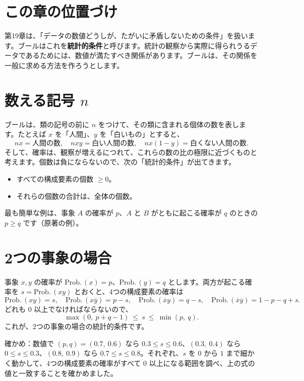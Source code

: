 \documentclass[a4paper,11pt,openany]{ltjsbook}
\newcommand{\nx}[1]{\overline{#1}}
\newcommand{\Prob}{\mathrm{Prob.}\,}
\begin{document}
\section{この章の位置づけ}

第19章は、「データの数値どうしが、たがいに矛盾しないための条件」を扱います。ブールはこれを\textbf{統計的条件}と呼びます。統計の観察から実際に得られうるデータであるためには、数値が満たすべき関係があります。ブールは、その関係を一般に求める方法を作ろうとします。

\section{数える記号 $n$}

ブールは、類の記号の前に $n$ をつけて、その類に含まれる個体の数を表します。たとえば $x$ を「人間」、$y$ を「白いもの」とすると、
\[
nx=\text{人間の数},\quad nxy=\text{白い人間の数},\quad nx(1-y)=\text{白くない人間の数}.
\]
そして、確率は、観察が増えるにつれて、これらの数の比の極限に近づくものと考えます。個数は負にならないので、次の「統計的条件」が出てきます。

\begin{itemize}[leftmargin=*]
\item すべての構成要素の個数 $\ge0$。
\item それらの個数の合計は、全体の個数。
\end{itemize}

最も簡単な例は、事象 $A$ の確率が $p$、$A$ と $B$ がともに起こる確率が $q$ のときの $p\ge q$ です（原著の例）。

\section{2つの事象の場合}

事象 $x,y$ の確率が $\Prob(x)=p$、$\Prob(y)=q$ とします。両方が起こる確率を $s=\Prob(xy)$ とおくと、4つの構成要素の確率は
\[
\Prob(xy)=s,\quad\Prob(x\nx y)=p-s,\quad\Prob(\nx xy)=q-s,\quad\Prob(\nx x\nx y)=1-p-q+s .
\]
どれも $0$ 以上でなければならないので、
\[
\max(0,\ p+q-1)\ \le\ s\ \le\ \min(p,\ q).
\]
これが、2つの事象の場合の統計的条件です。

\begin{examplebox}{確かめ：数値で}
$(p,q)=(0.7,\ 0.6)$ なら $0.3\le s\le0.6$、$(0.3,\ 0.4)$ なら $0\le s\le0.3$、$(0.8,\ 0.9)$ なら $0.7\le s\le0.8$。それぞれ、$s$ を $0$ から $1$ まで細かく動かして、4つの構成要素の確率がすべて $0$ 以上になる範囲を調べ、上の式の値と一致することを確かめました。
\end{examplebox}
\end{document}

